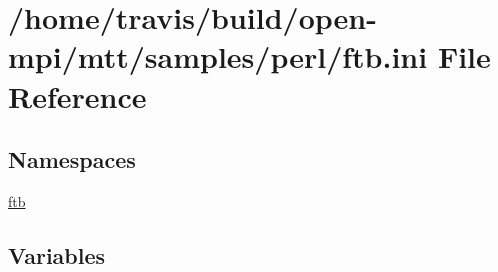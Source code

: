 \hypertarget{ftb_8ini}{\section{/home/travis/build/open-\/mpi/mtt/samples/perl/ftb.ini File Reference}
\label{ftb_8ini}
}
\subsection*{Namespaces}
\begin{DoxyCompactItemize}
\item 
\hyperlink{namespaceftb}{ftb}
\end{DoxyCompactItemize}
\subsection*{Variables}

